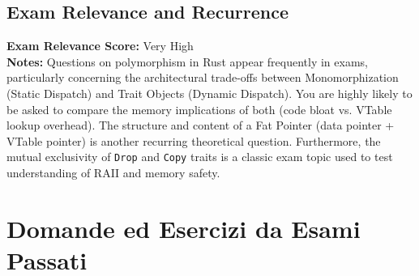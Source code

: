 \subsection*{Exam Relevance and Recurrence}
\textbf{Exam Relevance Score:} Very High \\
\textbf{Notes:} Questions on polymorphism in Rust appear frequently in exams, particularly concerning the architectural trade-offs between Monomorphization (Static Dispatch) and Trait Objects (Dynamic Dispatch). You are highly likely to be asked to compare the memory implications of both (code bloat vs. VTable lookup overhead). The structure and content of a Fat Pointer (data pointer + VTable pointer) is another recurring theoretical question. Furthermore, the mutual exclusivity of \texttt{Drop} and \texttt{Copy} traits is a classic exam topic used to test understanding of RAII and memory safety.

\section{Domande ed Esercizi da Esami Passati}

